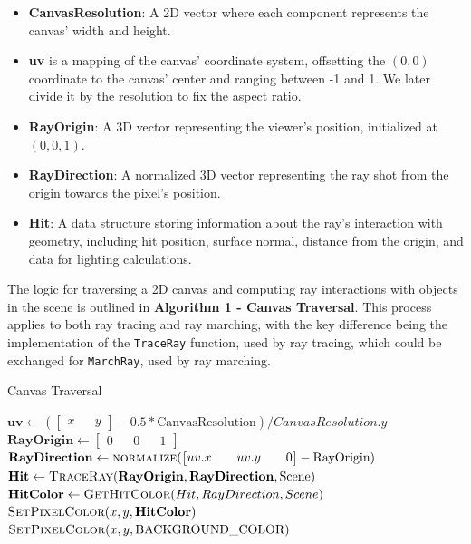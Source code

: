 \begin{itemize}
    \item \textbf{CanvasResolution}: A 2D vector where each component represents the canvas' width and height.
    \item \textbf{uv} is a mapping of the canvas' coordinate system, offsetting the $(0, 0)$ coordinate to the canvas' center and ranging between -1 and 1. We later divide it by the resolution to fix the aspect ratio.
    \item \textbf{RayOrigin}: A 3D vector representing the viewer's position, initialized at $(0, 0, 1)$.
    \item \textbf{RayDirection}: A normalized 3D vector representing the ray shot from the origin towards the pixel's position.
    \item \textbf{Hit}: A data structure storing information about the ray's interaction with geometry, including hit position, surface normal, distance from the origin, and data for lighting calculations.
\end{itemize}


The logic for traversing a 2D canvas and computing ray interactions with objects in the scene is outlined in \textbf{Algorithm 1 - Canvas Traversal}. This process applies to both ray tracing and ray marching, with the key difference being the implementation of the \texttt{TraceRay} function, used by ray tracing, which could be exchanged for \texttt{MarchRay}, used by ray marching.

\begin{algorithm}[H]
\caption{Canvas Traversal}
\begin{algorithmic}[1]
            \State $\mathbf{uv} \gets \left(\begin{bmatrix} x && y \end{bmatrix} - 0.5 * \text{CanvasResolution}\right) / CanvasResolution.y$
            \State $\mathbf{RayOrigin} \gets \begin{bmatrix} 0 && 0 && 1 \end{bmatrix}$
            \State $\mathbf{RayDirection} \gets \Call{normalize}{\begin{bmatrix} uv.x && uv.y && 0 \end{bmatrix} - \text{RayOrigin}}$
            \State $\mathbf{Hit} \gets \Call{TraceRay}{\mathbf{RayOrigin}, \mathbf{RayDirection}, \text{Scene}}$
                \State $\mathbf{HitColor} \gets \Call{GetHitColor}{Hit, RayDirection, Scene}$
                \State $\Call{SetPixelColor}{x, y, \mathbf{HitColor}}$
            \Else
                \State $\Call{SetPixelColor}{x, y, \text{BACKGROUND\_COLOR}}$
            \EndIf
        \EndFor
    \EndFor
\EndProcedure
\end{algorithmic}
\end{algorithm}

